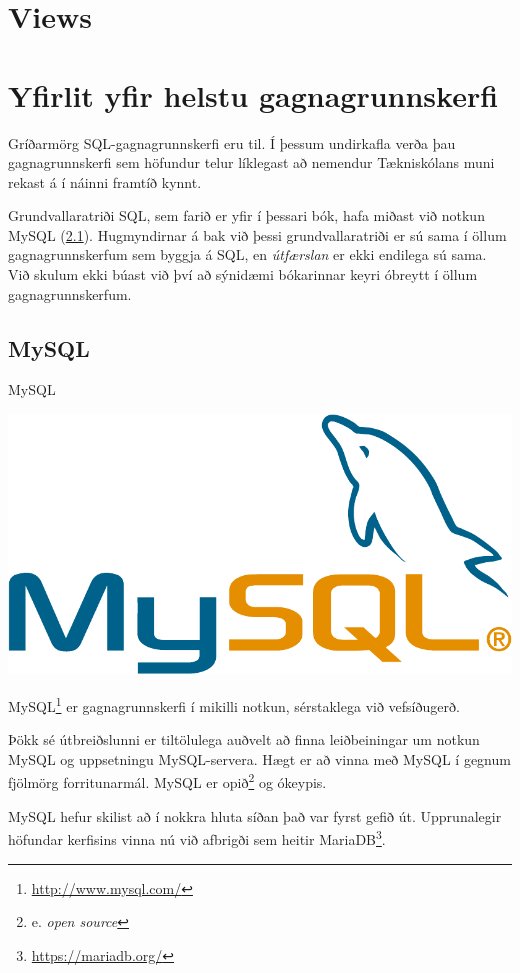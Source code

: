 \section{Views}
\section{Yfirlit yfir helstu gagnagrunnskerfi}
\label{undirkafli:helstu-gagnagrunnskerfi}
Gríðarmörg SQL-gagnagrunnskerfi eru til. Í þessum undirkafla verða þau gagnagrunnskerfi sem höfundur telur líklegast að nemendur Tækniskólans muni rekast á í náinni framtíð kynnt.

Grundvallaratriði SQL, sem farið er yfir í þessari bók, hafa miðast við notkun MySQL (\ref{undirkafli:mysql}). Hugmyndirnar á bak við þessi grundvallaratriði er sú sama í öllum gagnagrunnskerfum sem byggja á SQL, en \emph{útfærslan} er ekki endilega sú sama. Við skulum ekki búast við því að sýnidæmi bókarinnar keyri óbreytt í öllum gagnagrunnskerfum.
\subsection{MySQL}
\label{undirkafli:mysql}
\begin{marginfigure}
\caption{MySQL}
\label{mynd:mysql}
\centering
\includegraphics[width=\linewidth]{myndir/mysql}
\end{marginfigure}
MySQL\footnote{\url{http://www.mysql.com/}} er gagnagrunnskerfi í mikilli notkun, sérstaklega við vefsíðugerð.

Þökk sé útbreiðslunni er tiltölulega auðvelt að finna leiðbeiningar um notkun MySQL og uppsetningu MySQL-servera. Hægt er að vinna með MySQL í gegnum fjölmörg forritunarmál. MySQL er opið\footnote{e. \emph{open source}} og ókeypis.

MySQL hefur skilist að í nokkra hluta síðan það var fyrst gefið út. Upprunalegir höfundar kerfisins vinna nú við afbrigði sem heitir MariaDB\footnote{\url{https://mariadb.org/}}.
